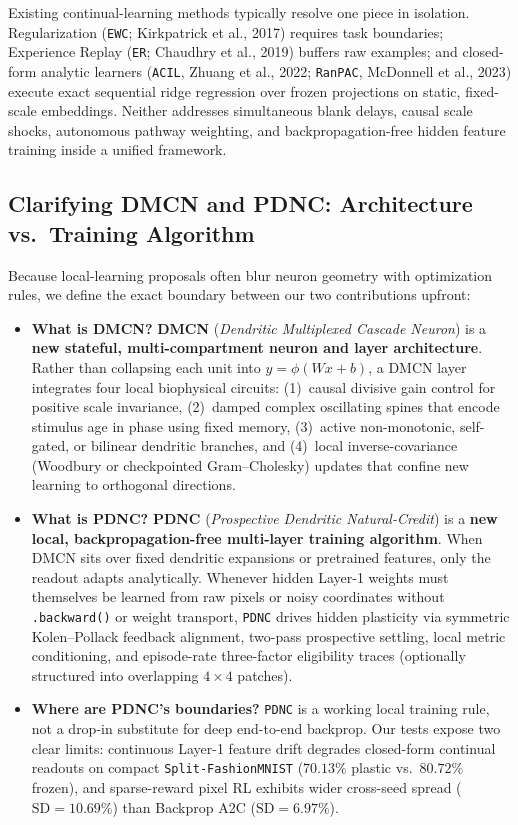\documentclass[11pt,a4paper]{article}
\begin{document}
Existing continual-learning methods typically resolve one piece in isolation. Regularization (\texttt{EWC}; Kirkpatrick et al., 2017) requires task boundaries; Experience Replay (\texttt{ER}; Chaudhry et al., 2019) buffers raw examples; and closed-form analytic learners (\texttt{ACIL}, Zhuang et al., 2022; \texttt{RanPAC}, McDonnell et al., 2023) execute exact sequential ridge regression over frozen projections on static, fixed-scale embeddings. Neither addresses simultaneous blank delays, causal scale shocks, autonomous pathway weighting, and backpropagation-free hidden feature training inside a unified framework.

\subsection{Clarifying DMCN and PDNC: Architecture vs.\ Training Algorithm}
Because local-learning proposals often blur neuron geometry with optimization rules, we define the exact boundary between our two contributions upfront:
\begin{itemize}
    \item \textbf{What is DMCN?} \textbf{DMCN} (\textit{Dendritic Multiplexed Cascade Neuron}) is a \textbf{new stateful, multi-compartment neuron and layer architecture}. Rather than collapsing each unit into $y = \phi(Wx+b)$, a DMCN layer integrates four local biophysical circuits: (1)~causal divisive gain control for positive scale invariance, (2)~damped complex oscillating spines that encode stimulus age in phase using fixed memory, (3)~active non-monotonic, self-gated, or bilinear dendritic branches, and (4)~local inverse-covariance (Woodbury or checkpointed Gram--Cholesky) updates that confine new learning to orthogonal directions.
    \item \textbf{What is PDNC?} \textbf{PDNC} (\textit{Prospective Dendritic Natural-Credit}) is a \textbf{new local, back\-propagation-free multi-layer training algorithm}. When DMCN sits over fixed dendritic expansions or pretrained features, only the readout adapts analytically. Whenever hidden Layer-1 weights must themselves be learned from raw pixels or noisy coordinates without \texttt{.backward()} or weight transport, \texttt{PDNC} drives hidden plasticity via symmetric Kolen--Pollack feedback alignment, two-pass prospective settling, local metric conditioning, and episode-rate three-factor eligibility traces (optionally structured into overlapping $4\times 4$ patches).
    \item \textbf{Where are PDNC's boundaries?} \texttt{PDNC} is a working local training rule, not a drop-in substitute for deep end-to-end backprop. Our tests expose two clear limits: continuous Layer-1 feature drift degrades closed-form continual readouts on compact \texttt{Split-FashionMNIST} ($70.13\%$ plastic vs.\ $80.72\%$ frozen), and sparse-reward pixel RL exhibits wider cross-seed spread ($\text{SD} = 10.69\%$) than Backprop A2C ($\text{SD} = 6.97\%$).
\end{itemize}
\end{document}
